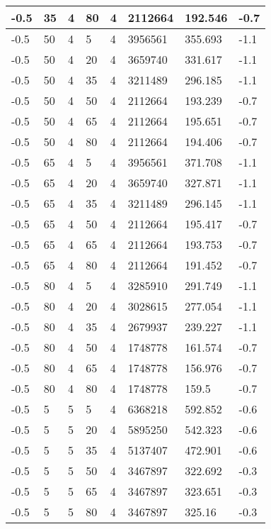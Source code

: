 \begin{longtable}{|p{1.4cm}|p{1.4cm}|p{1.4cm}|p{1.4cm}|p{1.4cm}|p{1.4cm}|p{1.4cm}|p{1.5cm}|}
        -0.5 & 35 & 4 & 80 & 4 & 2112664 & 192.546 & -0.7 \\ \hline
        -0.5 & 50 & 4 & 5 & 4 & 3956561 & 355.693 & -1.1 \\ \hline
        -0.5 & 50 & 4 & 20 & 4 & 3659740 & 331.617 & -1.1 \\ \hline
        -0.5 & 50 & 4 & 35 & 4 & 3211489 & 296.185 & -1.1 \\ \hline
        -0.5 & 50 & 4 & 50 & 4 & 2112664 & 193.239 & -0.7 \\ \hline
        -0.5 & 50 & 4 & 65 & 4 & 2112664 & 195.651 & -0.7 \\ \hline
        -0.5 & 50 & 4 & 80 & 4 & 2112664 & 194.406 & -0.7 \\ \hline
        -0.5 & 65 & 4 & 5 & 4 & 3956561 & 371.708 & -1.1 \\ \hline
        -0.5 & 65 & 4 & 20 & 4 & 3659740 & 327.871 & -1.1 \\ \hline
        -0.5 & 65 & 4 & 35 & 4 & 3211489 & 296.145 & -1.1 \\ \hline
        -0.5 & 65 & 4 & 50 & 4 & 2112664 & 195.417 & -0.7 \\ \hline
        -0.5 & 65 & 4 & 65 & 4 & 2112664 & 193.753 & -0.7 \\ \hline
        -0.5 & 65 & 4 & 80 & 4 & 2112664 & 191.452 & -0.7 \\ \hline
        -0.5 & 80 & 4 & 5 & 4 & 3285910 & 291.749 & -1.1 \\ \hline
        -0.5 & 80 & 4 & 20 & 4 & 3028615 & 277.054 & -1.1 \\ \hline
        -0.5 & 80 & 4 & 35 & 4 & 2679937 & 239.227 & -1.1 \\ \hline
        -0.5 & 80 & 4 & 50 & 4 & 1748778 & 161.574 & -0.7 \\ \hline
        -0.5 & 80 & 4 & 65 & 4 & 1748778 & 156.976 & -0.7 \\ \hline
        -0.5 & 80 & 4 & 80 & 4 & 1748778 & 159.5 & -0.7 \\ \hline
        -0.5 & 5 & 5 & 5 & 4 & 6368218 & 592.852 & -0.6 \\ \hline
        -0.5 & 5 & 5 & 20 & 4 & 5895250 & 542.323 & -0.6 \\ \hline
        -0.5 & 5 & 5 & 35 & 4 & 5137407 & 472.901 & -0.6 \\ \hline
        -0.5 & 5 & 5 & 50 & 4 & 3467897 & 322.692 & -0.3 \\ \hline
        -0.5 & 5 & 5 & 65 & 4 & 3467897 & 323.651 & -0.3 \\ \hline
        -0.5 & 5 & 5 & 80 & 4 & 3467897 & 325.16 & -0.3 \\ \hline

\end{longtable}
